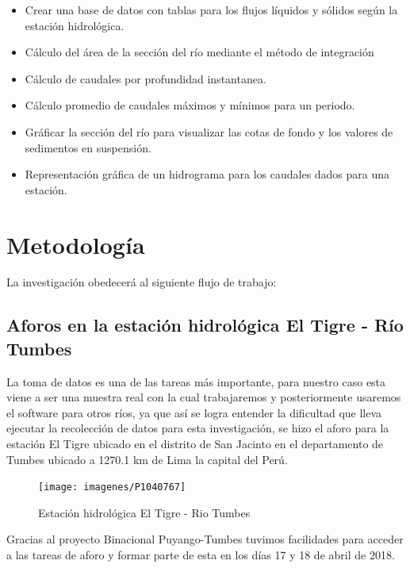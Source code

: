 \documentclass[12pt,a4paper]{report}
\begin{document}
\begin{itemize}
\begin{itemize}
	\end{itemize}
	\item Crear una base de datos con tablas para los flujos líquidos y sólidos según la estación hidrológica.
	\item Cálculo del área de la sección del río mediante el método de integración 
	\item Cálculo de caudales por profundidad instantanea.
	\item Cálculo promedio de caudales máximos y mínimos para un periodo.
	\item Gráficar la sección del río para visualizar las cotas de fondo y los valores de sedimentos en suspensión.
	\item Representación gráfica de un hidrograma para los caudales dados para una estación.
	\end{itemize}






\section{Metodología}
La investigación obedecerá al siguiente flujo de trabajo:

\subsection{Aforos en la estación hidrológica El Tigre - Río Tumbes}
La toma de datos es una de las tareas más importante, para nuestro caso esta viene a ser una muestra real con la cual trabajaremos y posteriormente usaremos el software para otros ríos, ya que así se logra entender la dificultad que lleva ejecutar la recolección de datos para esta investigación, se hizo el aforo para la estación El Tigre ubicado en el distrito de San Jacinto en el departamento de Tumbes ubicado a 1270.1 km de Lima la capital del Perú.

\begin{figure}[h]
  \centering
    \texttt{[image: imagenes/P1040767]}
  \caption{Estación hidrológica El Tigre - Rio Tumbes}
  \label{fig:estacion_hidrologica_n01}
\end{figure}

Gracias al proyecto Binacional Puyango-Tumbes tuvimos facilidades para acceder a las tareas de aforo y formar parte de esta en los días 17 y 18 de abril de 2018.\\
\end{document}
